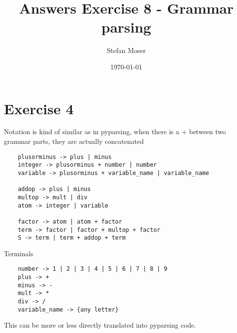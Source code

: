 \documentclass[11pt]{article}
\title{\textbf{Answers Exercise 8 - Grammar parsing}}
\author{Stefan Moser}
\date{\today}
\begin{document}
\maketitle


\section*{Exercise 4}
Notation is kind of similar as in pyparsing, when there is a + between two grammar parts,
they are actually concatenated
\begin{verbatim}
	plusorminus -> plus | minus
	integer -> plusorminus + number | number
	variable -> plusorminus + variable_name | variable_name
	
	addop -> plus | minus
	multop -> mult | div
	atom -> integer | variable
	
	factor -> atom | atom + factor
	term -> factor | factor + multop + factor
	S -> term | term + addop + term
\end{verbatim}
Terminals
\begin{verbatim}
	number -> 1 | 2 | 3 | 4 | 5 | 6 | 7 | 8 | 9
	plus -> +
	minus -> -
	mult -> *
	div -> /
	variable_name -> {any letter}
\end{verbatim}
This can be more or less directly translated into pyparsing code. 
\end{document}
